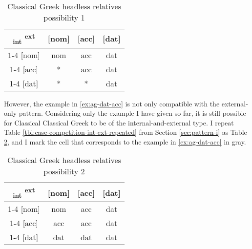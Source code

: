 \begin{table}[H]
  \center
  \caption{Classical Greek headless relatives possibility 1}
  \begin{tabular}{c|c|c|c}
    \toprule
    \textsubscript{\ac{int}} \textsuperscript{\ac{ext}}
           & [\ac{nom}]
           & [\ac{acc}]
           & [\ac{dat}]
           \\ \cmidrule{1-4}
       [\ac{nom}]
           & \ac{nom}
           & \ac{acc}
           & \ac{dat}
           \\ \cmidrule{1-4}
       [\ac{acc}]
           & *
           & \ac{acc}
           & \cellcolor{LG}\ac{dat}
           \\ \cmidrule{1-4}
       [\ac{dat}]
           & *
           & *
           & \ac{dat}
           \\
     \bottomrule
  \end{tabular}
    \label{tbl:case-competition-ag-poss1}
\end{table}

However, the example in \ref{ex:ag-dat-acc} is not only compatible with the external-only pattern. Considering only the example I have given so far, it is still possible for Classical Classical Greek to be of the internal-and-external type. I repeat Table \ref{tbl:case-competition-int-ext-repeated} from Section \ref{sec:pattern-i} as Table \ref{tbl:case-competition-ag-poss2}, and I mark the cell that corresponds to the example in \ref{ex:ag-dat-acc} in gray.

\begin{table}[H]
  \center
  \caption{Classical Greek headless relatives possibility 2}
  \begin{tabular}{c|c|c|c}
    \toprule
    \textsubscript{\ac{int}} \textsuperscript{\ac{ext}}
           & [\ac{nom}]
           & [\ac{acc}]
           & [\ac{dat}]
           \\ \cmidrule{1-4}
       [\ac{nom}]
           & \ac{nom}
           & \ac{acc}
           & \ac{dat}
           \\ \cmidrule{1-4}
       [\ac{acc}]
           & \ac{acc}
           & \ac{acc}
           & \cellcolor{LG}\ac{dat}
           \\ \cmidrule{1-4}
       [\ac{dat}]
           & \ac{dat}
           & \ac{dat}
           & \ac{dat}
           \\
     \bottomrule
  \end{tabular}
    \label{tbl:case-competition-ag-poss2}
\end{table}

